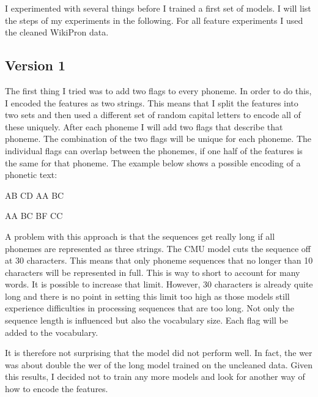 I experimented with several things before I trained a first set of models. I will list the steps of my experiments in the following. For all feature experiments I used the cleaned WikiPron data.

\subsection*{Version 1}

The first thing I tried was to add two flags to every phoneme. In order to do this, I encoded the features as two strings. This means that I split the features into two sets and then used a different set of random capital letters to encode all of these uniquely. After each phoneme I will add two flags that describe that phoneme. The combination of the two flags will be unique for each phoneme. The individual flags can overlap between the phonemes, if one half of the features is the same for that phoneme. The example below shows a possible encoding of a phonetic text:

\begin{covexamples}
\item \label{ex1}  AB CD  AA BC
\item \label{ex2}  AA BC   BF CC
\end{covexamples}

A problem with this approach is that the sequences get really long if all phonemes are represented as three strings. The CMU model cuts the sequence off at 30 characters. This means that only phoneme sequences that no longer than 10 characters will be represented in full. This is way to short to account for many words. It is possible to increase that limit. However, 30 characters is already quite long and there is no point in setting this limit too high as those models still experience difficulties in processing sequences that are too long. Not only the sequence length is influenced but also the vocabulary size. Each flag will be added to the vocabulary.  

It is therefore not surprising that the model did not perform well. In fact, the \ac{wer} was about double the \ac{wer} of the long model trained on the uncleaned data. Given this results, I decided not to train any more models and look for another way of how to encode the features.


